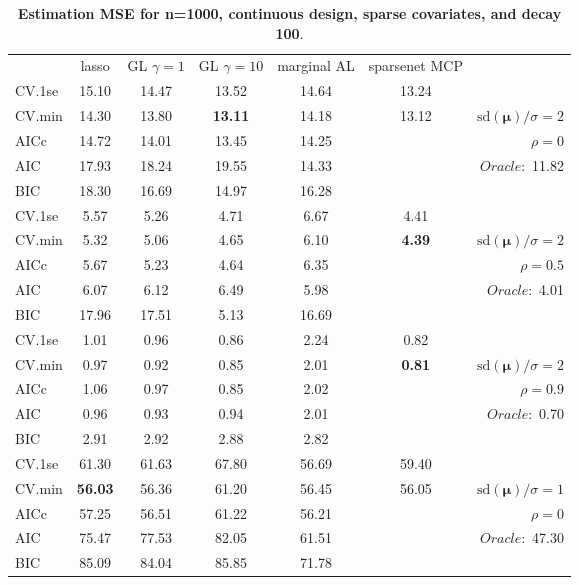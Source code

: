\begin{table}\vspace{-.5cm}
\caption[l]{ { \bf Estimation MSE for n=1000, continuous design, 
sparse covariates, and  decay  100}.}
\vspace{-.5cm}
\footnotesize{}
\begin{center}
\begin{tabular}{l*{5}{c}|r}
& lasso & GL $\gamma=1$ & GL $\gamma=10$ & marginal AL & sparsenet MCP  & \\
 \cline{1-7}
CV.1se & 15.10 & 14.47 & 13.52 & 14.64 & 13.24 & \\
CV.min & 14.30 & 13.80 & {\bf 13.11} & 14.18 & 13.12 &  $\mathrm{sd}(\mathbf{\mu})/\sigma=2$ \\
AICc & 14.72 & 14.01 & 13.45 & 14.25 & & $\rho=0$ \\
AIC & 17.93 & 18.24 & 19.55 & 14.33 & &  \multirow{2}{*}{$Oracle: $ 11.82} \\
BIC & 18.30 & 16.69 & 14.97 & 16.28 & &  \\
 \hline 
CV.1se & 5.57 & 5.26 & 4.71 & 6.67 & 4.41 & \\
CV.min & 5.32 & 5.06 & 4.65 & 6.10 & {\bf 4.39} &  $\mathrm{sd}(\mathbf{\mu})/\sigma=2$ \\
AICc & 5.67 & 5.23 & 4.64 & 6.35 & & $\rho=0.5$ \\
AIC & 6.07 & 6.12 & 6.49 & 5.98 & &  \multirow{2}{*}{$Oracle: $ 4.01} \\
BIC & 17.96 & 17.51 & 5.13 & 16.69 & &  \\
 \hline 
CV.1se & 1.01 & 0.96 & 0.86 & 2.24 & 0.82 & \\
CV.min & 0.97 & 0.92 & 0.85 & 2.01 & {\bf 0.81} &  $\mathrm{sd}(\mathbf{\mu})/\sigma=2$ \\
AICc & 1.06 & 0.97 & 0.85 & 2.02 & & $\rho=0.9$ \\
AIC & 0.96 & 0.93 & 0.94 & 2.01 & &  \multirow{2}{*}{$Oracle: $ 0.70} \\
BIC & 2.91 & 2.92 & 2.88 & 2.82 & &  \\
 \hline 
CV.1se & 61.30 & 61.63 & 67.80 & 56.69 & 59.40 & \\
CV.min & {\bf 56.03} & 56.36 & 61.20 & 56.45 & 56.05 &  $\mathrm{sd}(\mathbf{\mu})/\sigma=1$ \\
AICc & 57.25 & 56.51 & 61.22 & 56.21 & & $\rho=0$ \\
AIC & 75.47 & 77.53 & 82.05 & 61.51 & &  \multirow{2}{*}{$Oracle: $ 47.30} \\
BIC & 85.09 & 84.04 & 85.85 & 71.78 & &  \\

\end{tabular}
\end{center}
\end{table}
